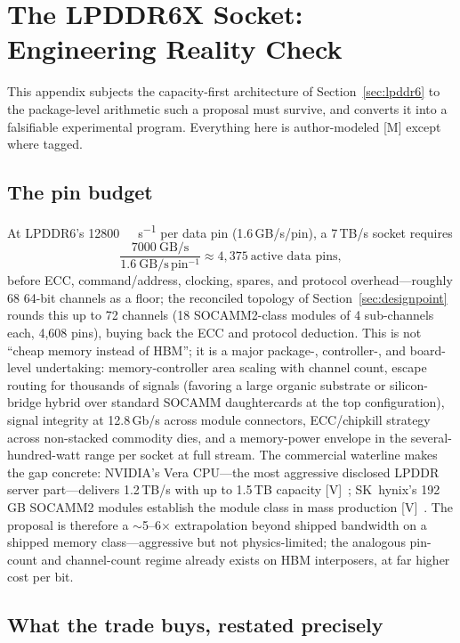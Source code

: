 \appendix

\chapter{The LPDDR6X Socket: Engineering Reality Check}
\label{app:lpddr}

This appendix subjects the capacity-first architecture of Section~\ref{sec:lpddr6} to the package-level arithmetic such a proposal must survive, and converts it into a falsifiable experimental program. Everything here is author-modeled [M] except where tagged.

\section{The pin budget}

At LPDDR6's \SI{12800}{\mega\bit\per\second} per data pin (1.6\,GB/s/pin), a 7\,TB/s socket requires
\[
\frac{7000\ \mathrm{GB/s}}{1.6\ \mathrm{GB/s\,pin^{-1}}} \approx 4{,}375\ \text{active data pins},
\]
before ECC, command/address, clocking, spares, and protocol overhead---roughly 68 64-bit channels as a floor; the reconciled topology of Section~\ref{sec:designpoint} rounds this up to 72 channels (18 SOCAMM2-class modules of 4 sub-channels each, 4,608 pins), buying back the ECC and protocol deduction. This is not ``cheap memory instead of HBM''; it is a major package-, controller-, and board-level undertaking: memory-controller area scaling with channel count, escape routing for thousands of signals (favoring a large organic substrate or silicon-bridge hybrid over standard SOCAMM daughtercards at the top configuration), signal integrity at 12.8\,Gb/s across module connectors, ECC/chipkill strategy across non-stacked commodity dies, and a memory-power envelope in the several-hundred-watt range per socket at full stream. The commercial waterline makes the gap concrete: NVIDIA's Vera CPU---the most aggressive disclosed LPDDR server part---delivers 1.2\,TB/s with up to 1.5\,TB capacity [V]~\cite{vera-cpu}; SK~hynix's 192\,GB SOCAMM2 modules establish the module class in mass production [V]~\cite{socamm2}. The proposal is therefore a $\sim$5--6$\times$ extrapolation beyond shipped bandwidth on a shipped memory class---aggressive but not physics-limited; the analogous pin-count and channel-count regime already exists on HBM interposers, at far higher cost per bit.

\section{What the trade buys, restated precisely}

